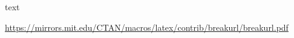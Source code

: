 \documentclass{article}
\begin{document}
text

\url{https://mirrors.mit.edu/CTAN/macros/latex/contrib/breakurl/breakurl.pdf}
\end{document}
